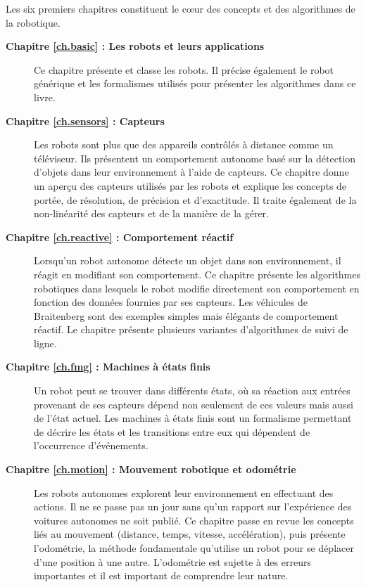 Les six premiers chapitres constituent le cœur des concepts et des algorithmes de la robotique.
\begin{description}
\item [\textbf{Chapitre \ref{ch.basic} : Les robots et leurs applications}] Ce chapitre présente et classe les robots. Il précise également le robot générique et les formalismes utilisés pour présenter les algorithmes dans ce livre.
\smallskip
\item [\textbf{Chapitre \ref{ch.sensors} : Capteurs}] Les robots sont plus que des appareils contrôlés à distance comme un téléviseur. Ils présentent un comportement autonome basé sur la détection d'objets dans leur environnement à l'aide de capteurs. Ce chapitre donne un aperçu des capteurs utilisés par les robots et explique les concepts de portée, de résolution, de précision et d'exactitude. Il traite également de la non-linéarité des capteurs et de la manière de la gérer.
\smallskip
\item [\textbf{Chapitre \ref{ch.reactive} : Comportement réactif}] Lorsqu'un robot autonome détecte un objet dans son environnement, il réagit en modifiant son comportement. Ce chapitre présente les algorithmes robotiques dans lesquels le robot modifie directement son comportement en fonction des données fournies par ses capteurs. Les véhicules de Braitenberg sont des exemples simples mais élégants de comportement réactif. Le chapitre présente plusieurs variantes d'algorithmes de suivi de ligne.
\smallskip
\item [\textbf{Chapitre \ref{ch.fmg} : Machines à états finis}] Un robot peut se trouver dans différents états, où sa réaction aux entrées provenant de ses capteurs dépend non seulement de ces valeurs mais aussi de l'état actuel. Les machines à états finis sont un formalisme permettant de décrire les états et les transitions entre eux qui dépendent de l'occurrence d'événements.
\smallskip
\item [\textbf{Chapitre \ref{ch.motion} : Mouvement robotique et odométrie}] Les robots autonomes explorent leur environnement en effectuant des actions. Il ne se passe pas un jour sans qu'un rapport sur l'expérience des voitures autonomes ne soit publié. Ce chapitre passe en revue les concepts liés au mouvement (distance, temps, vitesse, accélération), puis présente l'odométrie, la méthode fondamentale qu'utilise un robot pour se déplacer d'une position à une autre. L'odométrie est sujette à des erreurs importantes et il est important de comprendre leur nature.


\end{description}
